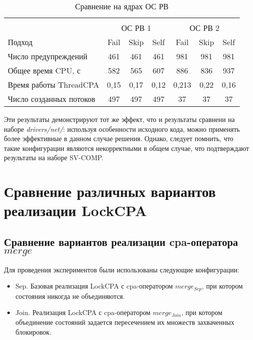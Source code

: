   \begin{table}[h]\footnotesize \centering
    \caption{Сравнение на ядрах ОС РВ}
  	\label{table-os-thread-create}
    \begin{tabular}{ | l | c | c | c | c | c | c |}
      \hline
      				& 		\multicolumn{3}{c|}{\combatmode} 		& \multicolumn{3}{c|}{\combatmode} \\
      						& 		\multicolumn{3}{c|}{ОС РВ 1} 		& \multicolumn{3}{c|}{ОС РВ 2} \\
      Подход         				& Fail 		& Skip 		& Self 		& Fail 		& Skip 		& Self  \\ \hline
      Число предупреждений			& 461   	& 461  		& 461  		& 981   	& 981   	& 981   \\ 
  	  Общее время CPU, с 			& 582 		& 565 		& 607  		& 886   	& 836	  	& 937   \\ 
\hspace{0.5cm} Время работы ThreadCPA & 0,15	& 0,17 		& 0,12 		& 0,213   	& 0,22 		& 0,16   \\ \hline
      Число созданных потоков  		& 497    	& 497    	& 497   	& 37   		& 37  		& 37   \\ 
      \hline
    \end{tabular}
  \end{table}

Эти результаты демонстрируют тот же эффект, что и результаты  сравнени на наборе \textit{drivers/net/}: используя особенности исходного кода, можно применять более эффективные в данном случае решения.
Однако, следует помнить, что такие конфигурации являются некорректными в общем случае, что подтверждают результаты на наборе SV-COMP.

\section{Сравнение различных вариантов реализации LockCPA}

\subsection{Сравнение вариантов реализации cpa-оператора $merge$}

Для проведения экспериментов были использованы следующие конфигурации:

\begin{itemize}
\item Sep. Базовая реализация LockCPA с cpa-оператором $merge_{Sep}$, при котором состояния никогда не объединяются.
\item Join. Реализация LockCPA с cpa-оператором $merge_{Join}$, при котором объединение состояний задается пересечением их множеств захваченных блокировок.
\end{itemize}

